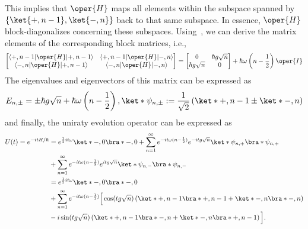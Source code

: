 This implies that \( \oper{H} \) maps all elements within the subspace spanned
by \\
\( \{ \ket{+, n - 1}, \ket{-, n} \} \) back to that same subspace.
In essence, \( \oper{H} \) block-diagonalizes concerning these subspaces. 
Using~, we can derive the matrix elements of the 
corresponding block matrices, i.e., 
\begin{equation}
\label{eq:appen_JCM_block_matrix}
\begin{bmatrix}
\langle +, n - 1 \lvert \oper{H} \lvert +, n - 1 \rangle & \langle +, n - 1 \lvert \oper{H} \lvert -, n \rangle \\
\langle -, n \lvert \oper{H} \lvert +, n - 1 \rangle & \langle -, n \lvert \oper{H} 
\lvert -, n \rangle \\
\end{bmatrix}
= 
\begin{bmatrix}
0 & \hbar g \sqrt{n} \\
\hbar g \sqrt{n} & 0 \\
\end{bmatrix}
+ \hbar \omega \left( n - \frac{1}{2} \right) \oper{I}
\end{equation}
The eigenvalues and eigenvectors of this matrix can be expressed as 
\begin{equation}
    \label{eq:appen_JCM_block_eigenvalues}
    E_{n,\pm} = \pm \hbar g \sqrt{n} + \hbar \omega \left( n - \frac{1}{2} \right),  
     \ket*{\psi_{n,\pm}} := \frac{1}{\sqrt{2}} 
     \left( \ket*{+, n - 1} \pm \ket*{-, n} \right)
\end{equation}
and finally, the uniraty evolution operator can be expressed as
\begin{align}
    U(t) = e^{-i t H/\hbar} 
    &= e^{\frac{1}{2} i t \omega } \ket*{-, 0}\bra*{-, 0} + \sum_{n=1}^{\infty} e^{-i t \omega (n - \frac{1}{2})} e^{-i t g \sqrt{n}} \ket*{\psi_{n,+}}\bra*{\psi_{n,+}} \nonumber \\
     &+ \sum_{n=1}^{\infty} e^{-i t \omega (n - \frac{1}{2})} e^{i t g \sqrt{n}} \ket*{\psi_{n,-}}\bra*{\psi_{n,-}} \nonumber \\
    &= e^{\frac{1}{2} i t \omega }\ket*{-, 0}\bra*{-, 0} \nonumber \\
     &+ \sum_{n=1}^{\infty} e^{-i t \omega (n - \frac{1}{2})} \Big[ \cos(t g \sqrt{n}) \left( \ket*{+, n - 1}\bra*{+, n - 1} + \ket*{-, n}\bra*{-, n} \right) \nonumber \\
     &- i \sin(t g \sqrt{n}) \left( \ket*{+, n - 1}\bra*{-, n} + \ket*{-, n}\bra*{+, n - 1} \right) \Big].
\end{align}

